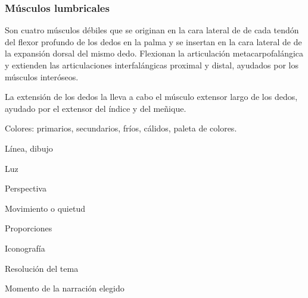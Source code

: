 \subsubsection{Músculos lumbricales}
Son cuatro músculos débiles que se originan en la cara lateral de de cada tendón del flexor profundo de los dedos en la palma y se insertan en la cara lateral de de la expansión dorsal del mismo dedo. Flexionan la articulación metacarpofalángica y extienden las articulaciones interfalángicas proximal y distal, ayudados por los músculos interóseos.

La extensión de los dedos la lleva a cabo el músculo extensor largo de los dedos, ayudado por el extensor del índice y del meñique.

Colores: primarios, secundarios, fríos, cálidos, paleta de colores.

Línea, dibujo

Luz

Perspectiva

Movimiento o quietud

Proporciones

Iconografía

Resolución del tema

Momento de la narración elegido
